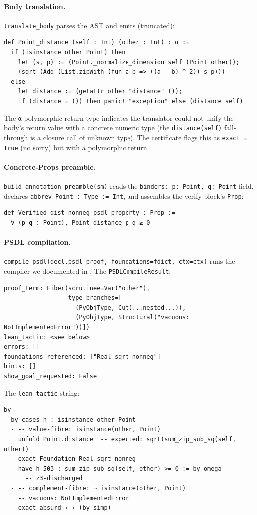 \paragraph{Body translation.}
\texttt{translate\_body} parses the AST and emits (truncated):
\begin{lstlisting}[language=lean4]
def Point_distance (self : Int) (other : Int) : α :=
  if (isinstance other Point) then
    let (s, p) := (Point._normalize_dimension self (Point other));
    (sqrt (Add (List.zipWith (fun a b => ((a - b) ^ 2)) s p)))
  else
    let distance := (getattr other "distance" ());
    if (distance = ()) then panic! "exception" else (distance self)
\end{lstlisting}
The \texttt{α}-polymorphic return type indicates the translator
could not unify the body's return value with a concrete numeric
type (the \texttt{distance(self)} fall-through is a closure call
of unknown type).  The certificate flags this as \texttt{exact = True}
(no sorry) but with a polymorphic return.

\paragraph{Concrete-Props preamble.}
\texttt{build\_annotation\_preamble(sm)} reads the
\texttt{binders: p: Point, q: Point} field, declares
\texttt{abbrev Point : Type := Int}, and assembles the verify
block's \texttt{Prop}:
\begin{lstlisting}[language=lean4]
def Verified_dist_nonneg_psdl_property : Prop :=
  ∀ (p q : Point), Point_distance p q ≥ 0
\end{lstlisting}

\paragraph{PSDL compilation.}
\texttt{compile\_psdl(decl.psdl\_proof, foundations=fdict, ctx=ctx)}
runs the compiler we documented in .  The
\texttt{PSDLCompileResult}:
\begin{verbatim}
proof_term: Fiber(scrutinee=Var("other"),
                  type_branches=[
                    (PyObjType, Cut(...nested...)),
                    (PyObjType, Structural("vacuous: NotImplementedError"))])
lean_tactic: <see below>
errors: []
foundations_referenced: ["Real_sqrt_nonneg"]
hints: []
show_goal_requested: False
\end{verbatim}

The \texttt{lean\_tactic} string:
\begin{lstlisting}[language=lean4]
by
  by_cases h : isinstance other Point
  · -- value-fibre: isinstance(other, Point)
    unfold Point.distance  -- expected: sqrt(sum_zip_sub_sq(self, other))
    exact Foundation_Real_sqrt_nonneg
    have h_503 : sum_zip_sub_sq(self, other) >= 0 := by omega
      -- z3-discharged
  · -- complement-fibre: ¬ isinstance(other, Point)
    -- vacuous: NotImplementedError
    exact absurd ‹_› (by simp)
\end{lstlisting}

